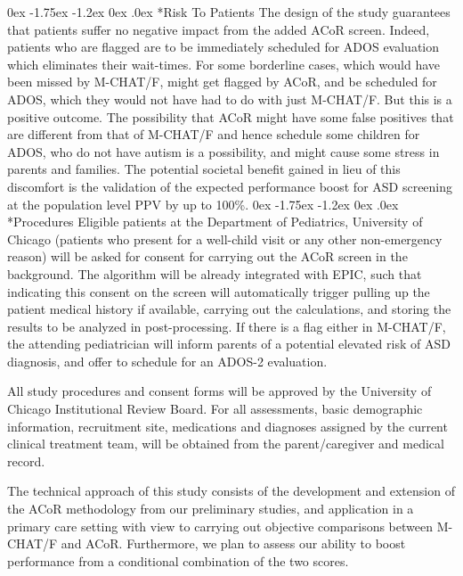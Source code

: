 \documentclass[onecolumn, compsoc,11pt]{IEEEtran}
\makeatletter
\renewcommand\subsection{\@startsection {subsection}{2}{\z@}%
                                   {0ex \@plus -1.75ex \@minus -1.2ex}%
                                   {0ex \@plus.0ex}%
                                   {\fontsize{11}{11}\selectfont\bfseries\sffamily\color{black}}}
\def\ZERO{ACoR\xspace}
\makeatother
\begin{document}
\subsection*{Risk To Patients} The design of the study guarantees that patients suffer no negative impact from the added \ZERO screen. Indeed, patients who are flagged are to be immediately scheduled for ADOS evaluation which eliminates their wait-times. For some borderline cases, which would have been missed by M-CHAT/F, might get flagged by \ZERO, and be scheduled for ADOS, which they would not have had to do with just M-CHAT/F. But this is a positive outcome. The possibility that \ZERO might have some false positives that are different from that of M-CHAT/F and hence schedule some children for ADOS, who do not have autism is a possibility, and might cause some stress in parents and families. The potential societal benefit gained in lieu of this discomfort is the validation of the expected  performance boost for ASD screening at the population level PPV by up to 100\%.
%
\subsection*{Procedures} Eligible patients at the Department of Pediatrics, University of Chicago (patients who present for a well-child visit or any other non-emergency reason) will be asked  for consent for carrying out the \ZERO screen in the background. The algorithm will be already integrated with EPIC, such that indicating this consent on the screen will automatically trigger pulling up the patient medical history if available,  carrying out the calculations, and storing the results to be analyzed in post-processing. If there is a flag either in M-CHAT/F, the attending pediatrician will inform parents of a potential elevated risk of ASD diagnosis, and offer to schedule for an ADOS-2 evaluation.

All study procedures and consent forms will be approved by the University of Chicago Institutional Review Board.  For all assessments, basic demographic information, recruitment site, medications and diagnoses assigned by the current clinical treatment team, will be obtained from the parent/caregiver and medical record.

The technical approach of this study consists of the development and extension of the \ZERO methodology from our preliminary studies, and application in a primary care setting with view to carrying out objective comparisons between M-CHAT/F and \ZERO. Furthermore, we plan to assess our ability to boost performance from a conditional combination of the two scores.
\end{document}
